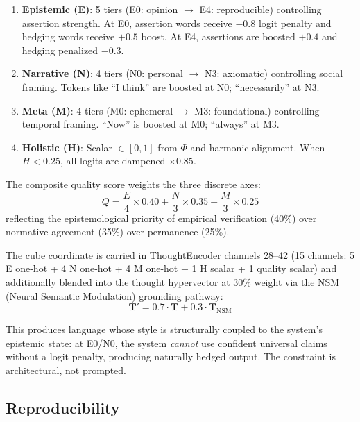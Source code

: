 \documentclass[12pt,a4paper]{article}
\begin{document}
\begin{enumerate}
\item \textbf{Epistemic (E)}: 5 tiers (E0: opinion $\to$ E4: reproducible) controlling assertion strength. At E0, assertion words receive $-0.8$ logit penalty and hedging words receive $+0.5$ boost. At E4, assertions are boosted $+0.4$ and hedging penalized $-0.3$.

\item \textbf{Narrative (N)}: 4 tiers (N0: personal $\to$ N3: axiomatic) controlling social framing. Tokens like ``I think'' are boosted at N0; ``necessarily'' at N3.

\item \textbf{Meta (M)}: 4 tiers (M0: ephemeral $\to$ M3: foundational) controlling temporal framing. ``Now'' is boosted at M0; ``always'' at M3.

\item \textbf{Holistic (H)}: Scalar $\in [0, 1]$ from $\Phi$ and harmonic alignment. When $H < 0.25$, all logits are dampened $\times 0.85$.
\end{enumerate}

The composite quality score weights the three discrete axes:
\begin{equation}
Q = \frac{E}{4} \times 0.40 + \frac{N}{3} \times 0.35 + \frac{M}{3} \times 0.25
\end{equation}
reflecting the epistemological priority of empirical verification (40\%) over normative agreement (35\%) over permanence (25\%).

The cube coordinate is carried in ThoughtEncoder channels 28--42 (15 channels: 5 E one-hot + 4 N one-hot + 4 M one-hot + 1 H scalar + 1 quality scalar) and additionally blended into the thought hypervector at 30\% weight via the NSM (Neural Semantic Modulation) grounding pathway:
\begin{equation}
\mathbf{T}' = 0.7 \cdot \mathbf{T} + 0.3 \cdot \mathbf{T}_{\text{NSM}}
\end{equation}

This produces language whose style is structurally coupled to the system's epistemic state: at E0/N0, the system \emph{cannot} use confident universal claims without a logit penalty, producing naturally hedged output. The constraint is architectural, not prompted.

\subsection*{Reproducibility}
\end{document}
